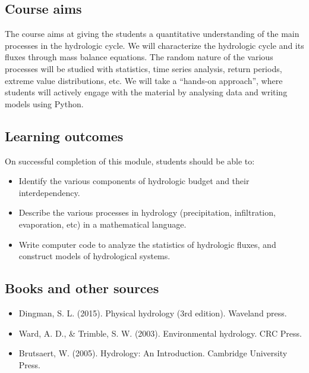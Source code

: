 \documentclass[
  letterpaper,
  DIV=11,
  numbers=noendperiod]{scrreprt}
\providecommand{\tightlist}{%
  \setlength{\itemsep}{0pt}\setlength{\parskip}{0pt}}\usepackage{longtable,booktabs,array}
\begin{document}
\hypertarget{course-aims}{%
\subsection*{Course aims}\label{course-aims}}

The course aims at giving the students a quantitative understanding of
the main processes in the hydrologic cycle. We will characterize the
hydrologic cycle and its fluxes through mass balance equations. The
random nature of the various processes will be studied with statistics,
time series analysis, return periods, extreme value distributions, etc.
We will take a ``hands-on approach'', where students will actively
engage with the material by analysing data and writing models using
Python.

\hypertarget{learning-outcomes}{%
\subsection*{Learning outcomes}\label{learning-outcomes}}

On successful completion of this module, students should be able to:

\begin{itemize}
\tightlist
\item
  Identify the various components of hydrologic budget and their
  interdependency.
\item
  Describe the various processes in hydrology (precipitation,
  infiltration, evaporation, etc) in a mathematical language.
\item
  Write computer code to analyze the statistics of hydrologic fluxes,
  and construct models of hydrological systems.
\end{itemize}

\hypertarget{books-and-other-sources}{%
\subsection*{Books and other sources}\label{books-and-other-sources}}

\begin{itemize}
\tightlist
\item
  Dingman, S. L. (2015). Physical hydrology (3rd edition). Waveland
  press.
\item
  Ward, A. D., \& Trimble, S. W. (2003). Environmental hydrology. CRC
  Press.
\item
  Brutsaert, W. (2005). Hydrology: An Introduction. Cambridge University
  Press.
\end{itemize}
\end{document}
